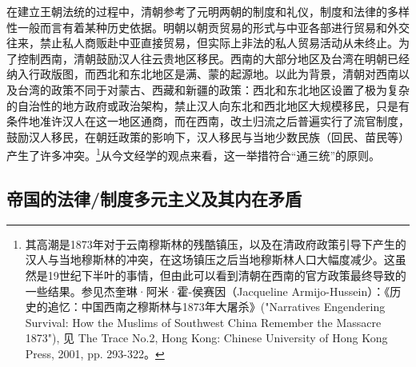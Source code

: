 \documentclass[a4paper, 12pt, openright]{ctexbook}
\begin{document}
在建立王朝法统的过程中，清朝参考了元明两朝的制度和礼仪，制度和法律的多样性一般而言有着某种历史依据。明朝以朝贡贸易的形式与中亚各部进行贸易和外交往来，禁止私人商贩赴中亚直接贸易，但实际上非法的私人贸易活动从未终止。为了控制西南，清朝鼓励汉人往云贵地区移民。西南的大部分地区及台湾在明朝已经纳入行政版图，而西北和东北地区是满、蒙的起源地。以此为背景，清朝对西南以及台湾的政策不同于对蒙古、西藏和新疆的政策：西北和东北地区设置了极为复杂的自治性的地方政府或政治架构，禁止汉人向东北和西北地区大规模移民，只是有条件地准许汉人在这一地区通商，而在西南，改土归流之后普遍实行了流官制度，鼓励汉人移民，在朝廷政策的影响下，汉人移民与当地少数民族（回民、苗民等）产生了许多冲突。\footnote{其高潮是1873年对于云南穆斯林的残酷镇压，以及在清政府政策引导下产生的汉人与当地穆斯林的冲突，在这场镇压之后当地穆斯林人口大幅度减少。这虽然是19世纪下半叶的事情，但由此可以看到清朝在西南的官方政策最终导致的一些结果。参见杰奎琳·阿米·霍-侯赛因（Jacqueline Armijo-Hussein）：《历史的追忆：中国西南之穆斯林与1873年大屠杀》("Narratives Engendering Survival: How the Muslims of Southwest China Remember the Massacre 1873"), 见 The Trace No.2, Hong Kong: Chinese University of Hong Kong Press, 2001, pp. 293-322。}从今文经学的观点来看，这一举措符合“通三统”的原则。

\subsection{帝国的法律/制度多元主义及其内在矛盾}
\end{document}
